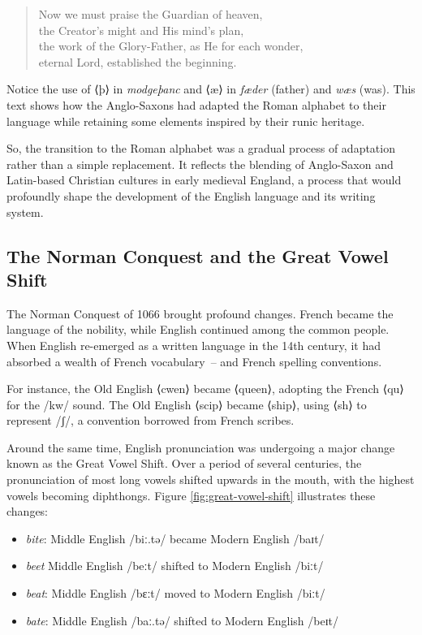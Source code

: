 \begin{quote}
    Now we must praise the Guardian of heaven,\\
    the Creator's might and His mind's plan,\\
    the work of the Glory-Father, as He for each wonder,\\
    eternal Lord, established the beginning.
\end{quote}

Notice the use of ⟨þ⟩ in \textit{modgeþanc} and ⟨æ⟩ in \textit{fæder} (father) and \textit{wæs} (was). This text shows how the Anglo-Saxons had adapted the Roman alphabet to their language while retaining some elements inspired by their runic heritage.

So, the transition to the Roman alphabet was a gradual process of adaptation rather than a simple replacement. It reflects the blending of Anglo-Saxon and Latin-based Christian cultures in early medieval England, a process that would profoundly shape the development of the English language and its writing system.

\subsection{The Norman Conquest and the Great Vowel Shift}\label{sec:great-vowel-shift}

The Norman Conquest of 1066 brought profound changes. French became the language of the nobility, while English continued among the common people. When English re-emerged as a written language in the 14th century, it had absorbed a wealth of French vocabulary~-- and French spelling conventions.

For instance, the Old English ⟨cwen⟩ became ⟨queen⟩, adopting the French ⟨qu⟩ for the /kw/ sound. The Old English ⟨scip⟩ became ⟨ship⟩, using ⟨sh⟩ to represent /ʃ/, a convention borrowed from French scribes.

Around the same time, English pronunciation was undergoing a major change known as the Great Vowel Shift. Over a period of several centuries, the pronunciation of most long vowels shifted upwards in the mouth, with the highest vowels becoming diphthongs. Figure \ref{fig:great-vowel-shift} illustrates these changes:

\begin{itemize}[noitemsep]
    \item \textit{bite}: Middle English /biː.tə/ became Modern English /baɪt/
    \item \textit{beet} Middle English /beːt/ shifted to Modern English /biːt/
    \item \textit{beat}: Middle English /bɛːt/ moved to Modern English /biːt/
    \item \textit{bate}: Middle English /baː.tə/ shifted to Modern English /beɪt/
\end{itemize}


